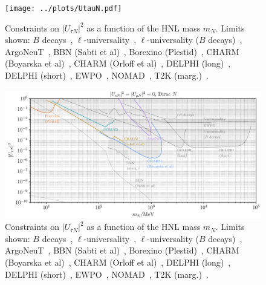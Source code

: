 \documentclass{revtex4-2}%
\begin{document}
%


\begin{figure}[h!]%
\centering%
\texttt{[image: ../plots/UtauN.pdf]}%
\caption{Constraints on $|U_{\tau N}|^2$ as a function of the HNL mass $m_N$. Limits shown: $B$ decays~\cite{Cvetic:2017gkt}, $\ell$-universality~\cite{Fernandez-Martinez:2016lgt}, $\ell$-universality ($B$ decays)~\cite{Cvetic:2017gkt}, ArgoNeuT~\cite{ArgoNeuT:2021clc}, BBN (Sabti et al)~\cite{Sabti:2020yrt}, Borexino (Plestid)~\cite{Plestid:2020ssy}, CHARM (Boyarska et al)~\cite{Boiarska:2021yho}, CHARM (Orloff et al)~\cite{Orloff:2002de}, DELPHI (long)~\cite{DELPHI:1996qcc}, DELPHI (short)~\cite{DELPHI:1996qcc}, EWPO~\cite{Bolton:2019pcu}, NOMAD~\cite{NOMAD:2001eyx}, T2K (marg.)~\cite{T2K:2019jwa}.}%
\end{figure}

%


\begin{figure}[h!]%
\centering%
\includegraphics[width=1\textwidth]{../plots/UtauN_nf03.pdf}%
\caption{Constraints on $|U_{\tau N}|^2$ as a function of the HNL mass $m_N$. Limits shown: $B$ decays~\cite{Cvetic:2017gkt}, $\ell$-universality~\cite{Fernandez-Martinez:2016lgt}, $\ell$-universality ($B$ decays)~\cite{Cvetic:2017gkt}, ArgoNeuT~\cite{ArgoNeuT:2021clc}, BBN (Sabti et al)~\cite{Sabti:2020yrt}, Borexino (Plestid)~\cite{Plestid:2020ssy}, CHARM (Boyarska et al)~\cite{Boiarska:2021yho}, CHARM (Orloff et al)~\cite{Orloff:2002de}, DELPHI (long)~\cite{DELPHI:1996qcc}, DELPHI (short)~\cite{DELPHI:1996qcc}, EWPO~\cite{Bolton:2019pcu}, NOMAD~\cite{NOMAD:2001eyx}, T2K (marg.)~\cite{T2K:2019jwa}.}%
\end{figure}

%
%
%
\end{document}
